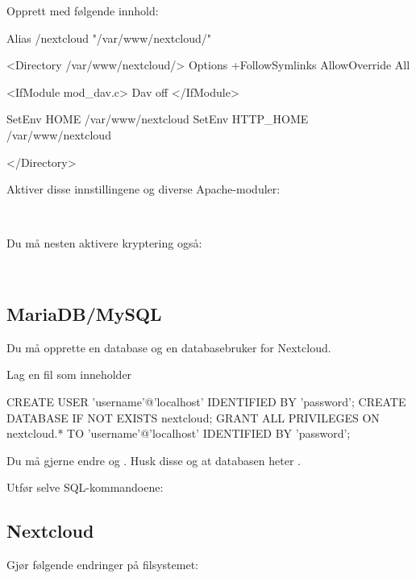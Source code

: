 Opprett  med følgende innhold:

\begin{filedata}
Alias /nextcloud "/var/www/nextcloud/"

<Directory /var/www/nextcloud/>
  Options +FollowSymlinks
  AllowOverride All

 <IfModule mod_dav.c>
  Dav off
 </IfModule>

 SetEnv HOME /var/www/nextcloud
 SetEnv HTTP_HOME /var/www/nextcloud

</Directory>
\end{filedata}

Aktiver disse innstillingene og diverse Apache-moduler:

\\

Du må nesten aktivere kryptering også:

\\

\subsection*{MariaDB/MySQL}

Du må opprette en database og en databasebruker for Nextcloud.

Lag en fil  som inneholder

\begin{filedata}
CREATE USER 'username'@'localhost' IDENTIFIED BY 'password';
CREATE DATABASE IF NOT EXISTS nextcloud;
GRANT ALL PRIVILEGES ON nextcloud.* TO 
  'username'@'localhost' IDENTIFIED BY 'password';
\end{filedata}

Du må gjerne endre  og . 
Husk disse og at databasen heter .

Utfør selve SQL-kommandoene:


\subsection*{Nextcloud}

Gjør følgende endringer på filsystemet:

\\
\\

